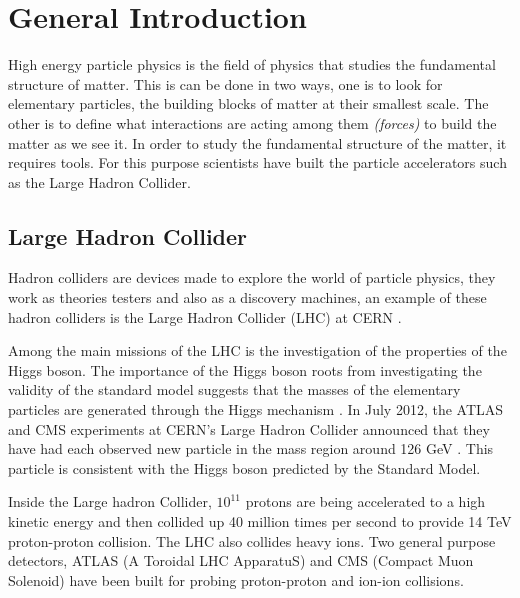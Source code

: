 \chapter{General Introduction}
High energy particle physics is the field of physics that studies the fundamental structure of matter. This is can be done in two ways, one is to look for elementary particles, the building blocks of matter at their smallest scale. The other is to define what interactions are acting among them
\emph{(forces)} to build the matter as we see it. In order to study the fundamental structure of the matter, it requires tools. For this purpose scientists have built the particle accelerators such as the Large Hadron Collider.



\section{Large Hadron Collider}

Hadron colliders are devices made to explore the world of particle physics, they work as theories testers and also as a discovery machines, an example of these hadron colliders is the Large Hadron Collider (LHC) at CERN \citep{1748-0221-3-08-S08001}.

Among the main missions of the LHC is the investigation of the properties of the Higgs boson. The importance of the Higgs boson roots from investigating the validity of the standard model suggests that the masses of the elementary particles are generated through the Higgs mechanism \citep{particle}. In July 2012, the ATLAS and CMS experiments at CERN's Large Hadron Collider announced that they have had each observed new particle in the mass region around 126 GeV \citep{Aad:2012tfa}. This particle is consistent with the Higgs boson predicted by the Standard Model.  

Inside the Large hadron Collider, $10^{11}$ protons are being accelerated to a high kinetic energy and then collided up 40 million times per second to provide 14 \si{TeV} proton-proton collision. The LHC also collides heavy ions. Two general purpose detectors, ATLAS (A Toroidal LHC ApparatuS) \cite{Aad:2008zzm} and CMS (Compact Muon Solenoid) \cite{1748-0221-3-08-S08004} have been built for probing proton-proton and ion-ion collisions.
 
